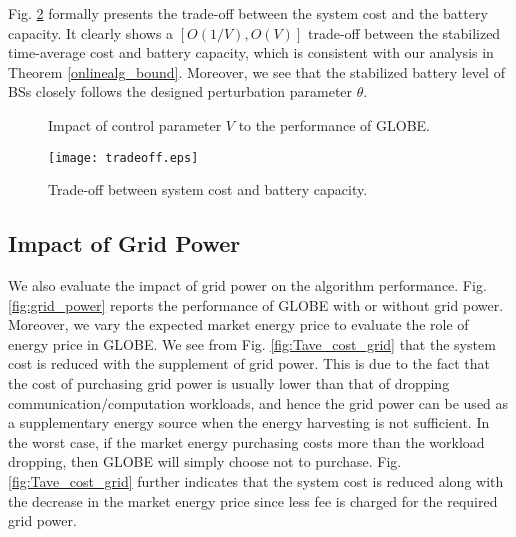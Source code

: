 \documentclass[12pt, draftclsnofoot, letterpaper, onecolumn]{IEEEtran}
\begin{document}
{Fig. \ref{fig:tradeoff} formally presents the trade-off between the system cost and the battery capacity. It clearly shows a $[O(1/V),O(V)]$ trade-off between the stabilized time-average cost and battery capacity, which is consistent with our analysis in Theorem \ref{onlinealg_bound}.  Moreover, we see that the stabilized battery level of BSs closely follows the designed perturbation parameter $\theta$.

\begin{figure}[h]
	\centering	
	\caption{Impact of control parameter $V$ to the performance of GLOBE.}
	\label{fig:impact_V}
\vspace{-20pt}
\end{figure}

\begin{figure}[h]
	\centering	
	\texttt{[image: tradeoff.eps]}
	\vspace{-10pt}
	\caption{Trade-off between system cost and battery capacity.}
	\label{fig:tradeoff}
\vspace{-20pt}
\end{figure}

\subsection{Impact of Grid Power}
We also evaluate the impact of grid power on the algorithm performance. Fig. \ref{fig:grid_power} reports the performance of GLOBE with or without grid power. Moreover, we vary the expected market energy price to evaluate the role of energy price in GLOBE. We see from Fig. \ref{fig:Tave_cost_grid} that the system cost is reduced  with the supplement of grid power. This is due to the fact that the cost of purchasing grid power is usually lower than that of dropping communication/computation workloads, and hence the grid power can be used as a supplementary energy source when the energy harvesting is not sufficient. In the worst case, if the market energy purchasing costs more than the workload dropping, then GLOBE will simply choose not to purchase. Fig. \ref{fig:Tave_cost_grid} further indicates that the system cost is reduced along with the decrease in the market energy price since less fee is charged for the required grid power.

}
\end{document}
